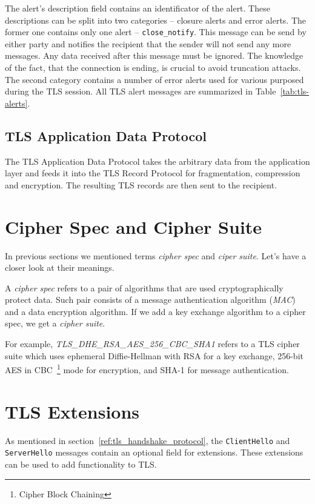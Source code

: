     The alert's description field contains an identificator of the alert.
    These descriptions can be split into two categories -- closure alerts
    and error alerts. The former one contains only one alert --
    \texttt{close\_notify}. This message can be send by either party and
    notifies the recipient that the
    sender will not send any more messages. Any data received after this message
    must be ignored. The knowledge of the fact, that the connection is ending,
    is crucial to avoid truncation attacks.
    The second category contains a number of error alerts used for various
    purposed during the TLS session. All TLS alert messages are summarized
    in Table~\ref{tab:tls-alerts}.

\subsection{TLS Application Data Protocol}
    The TLS Application Data Protocol takes the arbitrary data from the application
    layer and feeds it into the TLS Record Protocol for fragmentation, compression
    and encryption. The resulting TLS records are then sent to the recipient.

\section{Cipher Spec and Cipher Suite}
    In previous sections we mentioned terms \textit{cipher spec} and
    \textit{ciper suite}. Let's have a closer look at their meanings.

    A \textit{cipher spec} refers to a pair of algorithms that are used
    cryptographically protect data. Such pair consists of a message
    authentication algorithm (\textit{MAC}) and a data encryption algorithm. If we
    add a key exchange algorithm to a cipher spec, we get a \textit{cipher suite}.

    For example, \textit{TLS\_DHE\_RSA\_AES\_256\_CBC\_SHA1} refers to a TLS
    cipher suite which uses ephemeral Diffie-Hellman with RSA for a key
    exchange, 256-bit AES in CBC~\footnote{Cipher Block Chaining} mode for
    encryption, and SHA-1 for message authentication.

\section{TLS Extensions}
    As mentioned in section~\ref{ref:tls_handshake_protocol}, the \texttt{ClientHello}
    and \texttt{ServerHello} messages contain an optional field for extensions.
    These extensions can be used to add functionality to TLS.

